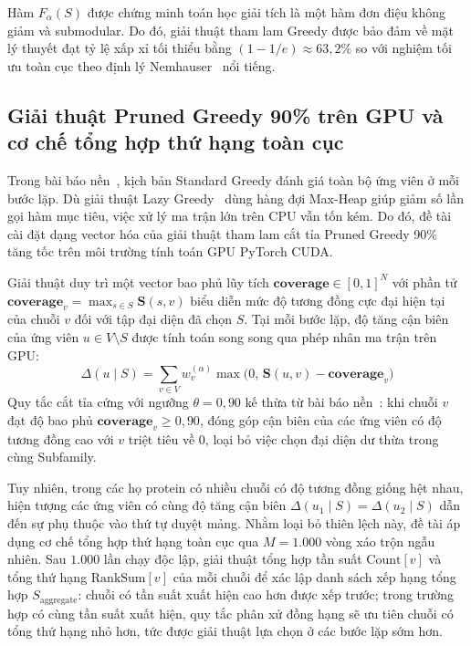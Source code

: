 Hàm $F_\alpha(S)$ được chứng minh toán học giải tích là một hàm đơn điệu không giảm và submodular. Do đó, giải thuật tham lam Greedy được bảo đảm về mặt lý thuyết đạt tỷ lệ xấp xỉ tối thiểu bằng $(1 - 1/e) \approx 63{,}2\%$ so với nghiệm tối ưu toàn cục theo định lý Nemhauser~\cite{nemhauser1978} nổi tiếng.

\subsection{Giải thuật Pruned Greedy 90\% trên GPU và cơ chế tổng hợp thứ hạng toàn cục}
Trong bài báo nền~\cite{nguyen2025}, kịch bản Standard Greedy đánh giá toàn bộ ứng viên ở mỗi bước lặp. Dù giải thuật Lazy Greedy~\cite{minoux1978} dùng hàng đợi Max-Heap giúp giảm số lần gọi hàm mục tiêu, việc xử lý ma trận lớn trên CPU vẫn tốn kém. Do đó, đề tài cài đặt dạng vector hóa của giải thuật tham lam cắt tỉa Pruned Greedy 90\%~\cite{nguyen2025} tăng tốc trên môi trường tính toán GPU PyTorch CUDA.

Giải thuật duy trì một vector bao phủ lũy tích $\mathbf{coverage} \in [0, 1]^N$ với phần tử $\mathbf{coverage}_v = \max_{s \in S} \mathbf{S}(s, v)$ biểu diễn mức độ tương đồng cực đại hiện tại của chuỗi $v$ đối với tập đại diện đã chọn $S$. Tại mỗi bước lặp, độ tăng cận biên của ứng viên $u \in V \setminus S$ được tính toán song song qua phép nhân ma trận trên GPU:
\begin{equation}
    \Delta(u \mid S) = \sum_{v \in V} w_v^{(\alpha)} \max\bigl(0, \, \mathbf{S}(u, v) - \mathbf{coverage}_v\bigr)
    \label{eq:marginal_gain_gpu}
\end{equation}
Quy tắc cắt tỉa cứng với ngưỡng $\theta = 0{,}90$ kế thừa từ bài báo nền~\cite{nguyen2025}: khi chuỗi $v$ đạt độ bao phủ $\mathbf{coverage}_v \ge 0{,}90$, đóng góp cận biên của các ứng viên có độ tương đồng cao với $v$ triệt tiêu về $0$, loại bỏ việc chọn đại diện dư thừa trong cùng Subfamily.

Tuy nhiên, trong các họ protein có nhiều chuỗi có độ tương đồng giống hệt nhau, hiện tượng các ứng viên có cùng độ tăng cận biên $\Delta(u_1 \mid S) = \Delta(u_2 \mid S)$ dẫn đến sự phụ thuộc vào thứ tự duyệt mảng. Nhằm loại bỏ thiên lệch này, đề tài áp dụng cơ chế tổng hợp thứ hạng toàn cục qua $M = 1.000$ vòng xáo trộn ngẫu nhiên. Sau $1.000$ lần chạy độc lập, giải thuật tổng hợp tần suất $\text{Count}[v]$ và tổng thứ hạng $\text{RankSum}[v]$ của mỗi chuỗi để xác lập danh sách xếp hạng tổng hợp $S_{\text{aggregate}}$: chuỗi có tần suất xuất hiện cao hơn được xếp trước; trong trường hợp có cùng tần suất xuất hiện, quy tắc phân xử đồng hạng sẽ ưu tiên chuỗi có tổng thứ hạng nhỏ hơn, tức được giải thuật lựa chọn ở các bước lặp sớm hơn.

